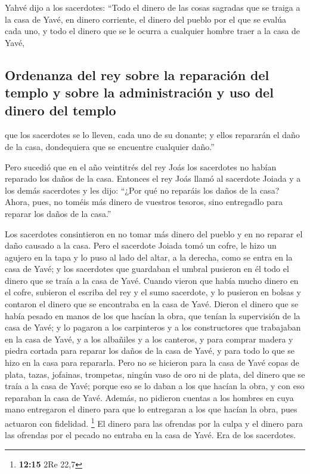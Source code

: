 \begin{paracol}{2}
 Yahvé dijo a los sacerdotes: ``Todo el dinero de las
cosas sagradas que se traiga a la casa de Yavé, en dinero corriente, el
dinero del pueblo por el que se evalúa cada uno, y todo el dinero que se
le ocurra a cualquier hombre traer a la casa de Yavé,

\hypertarget{ordenanza-del-rey-sobre-la-reparaciuxf3n-del-templo-y-sobre-la-administraciuxf3n-y-uso-del-dinero-del-templo}{%
\subsection{Ordenanza del rey sobre la reparación del templo y sobre la
administración y uso del dinero del
templo}\label{ordenanza-del-rey-sobre-la-reparaciuxf3n-del-templo-y-sobre-la-administraciuxf3n-y-uso-del-dinero-del-templo}}

 que los sacerdotes se lo lleven, cada uno de su donante;
y ellos repararán el daño de la casa, dondequiera que se encuentre
cualquier daño.''

 Pero sucedió que en el año veintitrés del rey Joás los
sacerdotes no habían reparado los daños de la casa. 
Entonces el rey Joás llamó al sacerdote Joiada y a los demás sacerdotes
y les dijo: ``¿Por qué no reparáis los daños de la casa? Ahora, pues, no
toméis más dinero de vuestros tesoros, sino entregadlo para reparar los
daños de la casa.''

 Los sacerdotes consintieron en no tomar más dinero del
pueblo y en no reparar el daño causado a la casa.  Pero el
sacerdote Joiada tomó un cofre, le hizo un agujero en la tapa y lo puso
al lado del altar, a la derecha, como se entra en la casa de Yavé; y los
sacerdotes que guardaban el umbral pusieron en él todo el dinero que se
traía a la casa de Yavé.  Cuando vieron que había mucho
dinero en el cofre, subieron el escriba del rey y el sumo sacerdote, y
lo pusieron en bolsas y contaron el dinero que se encontraba en la casa
de Yavé.  Dieron el dinero que se había pesado en manos
de los que hacían la obra, que tenían la supervisión de la casa de Yavé;
y lo pagaron a los carpinteros y a los constructores que trabajaban en
la casa de Yavé,  y a los albañiles y a los canteros, y
para comprar madera y piedra cortada para reparar los daños de la casa
de Yavé, y para todo lo que se hizo en la casa para repararla.
 Pero no se hicieron para la casa de Yavé copas de plata,
tazas, jofainas, trompetas, ningún vaso de oro ni de plata, del dinero
que se traía a la casa de Yavé;  porque eso se lo daban a
los que hacían la obra, y con eso reparaban la casa de Yavé.
 Además, no pidieron cuentas a los hombres en cuya mano
entregaron el dinero para que lo entregaran a los que hacían la obra,
pues actuaron con fidelidad. \footnote{\textbf{12:15} 2Re 22,7}
 El dinero para las ofrendas por la culpa y el dinero
para las ofrendas por el pecado no entraba en la casa de Yavé. Era de
los sacerdotes.


\end{paracol}
